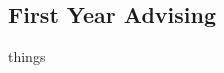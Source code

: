 \documentclass[../../../main.tex]{subfiles}
\begin{document}
\subsection{First Year Advising}

things
\end{document}
